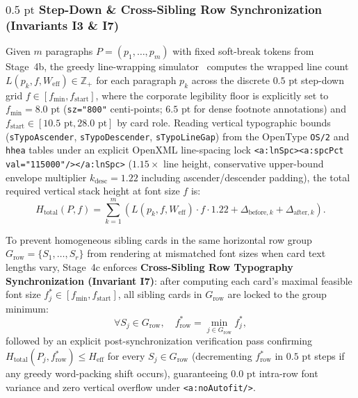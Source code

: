\documentclass[10pt,journal,compsoc]{IEEEtran}
\begin{document}
\subsubsection{$0.5\text{ pt}$ Step-Down \& Cross-Sibling Row Synchronization (Invariants I3 \& I7)}
Given $m$ paragraphs $P = (p_1, \dots, p_m)$ with fixed soft-break tokens from Stage~4b, the greedy line-wrapping simulator~\cite{knuth1984tex} computes the wrapped line count $L(p_k, f, W_{\text{eff}}) \in \mathbb{Z}_+$ for each paragraph $p_k$ across the discrete $0.5\text{ pt}$ step-down grid $f \in [f_{\min}, f_{\text{start}}]$, where the corporate legibility floor is explicitly set to $f_{\min} = 8.0\text{ pt}$ (\texttt{sz="800"} centi-points; $6.5\text{ pt}$ for dense footnote annotations) and $f_{\text{start}} \in [10.5\text{ pt}, 28.0\text{ pt}]$ by card role. Reading vertical typographic bounds (\texttt{sTypoAscender}, \texttt{sTypoDescender}, \texttt{sTypoLineGap}) from the OpenType \texttt{OS/2} and \texttt{hhea} tables under an explicit OpenXML line-spacing lock \texttt{<a:lnSpc><a:spcPct val="115000"/></a:lnSpc>} ($1.15\times$ line height, conservative upper-bound envelope multiplier $k_{\text{desc}} = 1.22$ including ascender/descender padding), the total required vertical stack height at font size $f$ is:
\begin{equation}
    H_{\text{total}}(P, f) = \sum_{k=1}^{m} \left( L(p_k, f, W_{\text{eff}}) \cdot f \cdot 1.22 + \Delta_{\text{before},k} + \Delta_{\text{after},k} \right).
    \label{eq:htotal}
\end{equation}

To prevent homogeneous sibling cards in the same horizontal row group $G_{\text{row}} = \{S_1, \dots, S_r\}$ from rendering at mismatched font sizes when card text lengths vary, Stage~4c enforces \textbf{Cross-Sibling Row Typography Synchronization (Invariant I7)}: after computing each card's maximal feasible font size $f^*_j \in [f_{\min}, f_{\text{start}}]$, all sibling cards in $G_{\text{row}}$ are locked to the group minimum:
\begin{equation}
    \forall S_j \in G_{\text{row}}, \quad f^*_{\text{row}} = \min_{j \in G_{\text{row}}} f^*_j,
    \label{eq:rowsync}
\end{equation}
followed by an explicit post-synchronization verification pass confirming $H_{\text{total}}(P_j, f^*_{\text{row}}) \le H_{\text{eff}}$ for every $S_j \in G_{\text{row}}$ (decrementing $f^*_{\text{row}}$ in $0.5\text{ pt}$ steps if any greedy word-packing shift occurs), guaranteeing $0.0\text{ pt}$ intra-row font variance and zero vertical overflow under \texttt{<a:noAutofit/>}.
\end{document}
